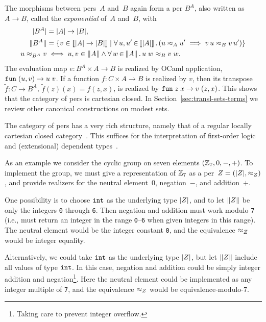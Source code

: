 The morphisms between pers~$A$ and~$B$ again form a per
$B^A$, also written as $A \to B$, called the \emph{exponential} of~$A$
and~$B$, with
%
\begin{align*}
  |B^A| &= |A| \to |B|,\\
  \|B^A\| &=
  \{v \in [\![|A| \to |B|]\!] \mid 
    \forall\, u,u' \,{\in}\, [\![|A|]\!]\,.\left(u \approx_A u' \implies v\,u \approx_B v\,u'\right)\}
  \\
  u \approx_{B^A} v &\iff u, v \in \|A\| \land
  \forall\, w \,{\in}\, \|A\|\,.\,u\;w \approx_B v\;w.
\end{align*}
%
The evaluation map $e : B^A \times A \to B$ is realized by OCaml
application, $\mathtt{fun}\;(u,v) \to u\;v$. If a function $f : C \times A \to
B$ is realized by $v$, then its transpose $\tilde{f} : C \to B^A$,
$\tilde{f}(z)(x) = f(z,x)$, is realized by $\mathtt{fun}\;z\;x \to v \; (z,x)$.
This shows that the category of pers is cartesian closed. In
Section~\ref{sec:transl-sets-terms} we review other canonical
constructions on modest sets.

\bigskip
\else %
%
The category of pers has a very rich structure, namely that of a
regular locally cartesian closed category~\cite{Bauer:00}. This
suffices for the interpretation of first-order logic and (extensional)
dependent types~\cite{JacobsB:cltt}.
%
\fi %

\iflong
%
As an example we consider the cyclic group on seven elements $(\mathbb{Z}_7,
0, {-}, {+})$. To implement the group, we must give a representation
of $\mathbb{Z}_7$ as a per~$Z = (|Z|, {\approx_Z})$, and
provide realizers for the neutral element~$0$, negation~$-$, and
addition~$+$. 

One possibility is to choose $\mathtt{int}$ as the underlying type
$|Z|$, and to let $\|Z\|$ be only the integers \texttt{0}
through \texttt{6}. Then negation and addition must work modulo
\texttt{7} (i.e., must return an integer in the range
\texttt{0}--\texttt{6} when given integers in this range). The neutral
element would be the integer constant \texttt{0}, and the equivalence
$\approx_Z$ would be integer equality.

Alternatively, we could take $\mathtt{int}$ as the underlying type
$|Z|$, but let $\|Z\|$ include all values of type $\mathtt{int}$. In this
case, negation and addition could be simply integer addition and
negation\footnote{Taking care to prevent integer
  overflow.}. Here the neutral element could be implemented as any
integer multiple of \texttt{7}, and the equivalence $\approx_Z$ would be
equivalence-modulo-7.


